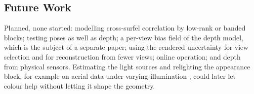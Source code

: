 \subsection{Future Work}
Planned, none started: modelling cross-surfel correlation by low-rank or banded blocks; testing poses
as well as depth; a per-view bias field of the depth model, which is the subject of a separate paper; using the rendered uncertainty for view selection and for reconstruction from fewer
views; online operation; and depth from physical sensors. Estimating the light sources and relighting the
appearance block, for example on aerial data under varying illumination \cite{data_beyondlight}, could later
let colour help without letting it shape the geometry.

